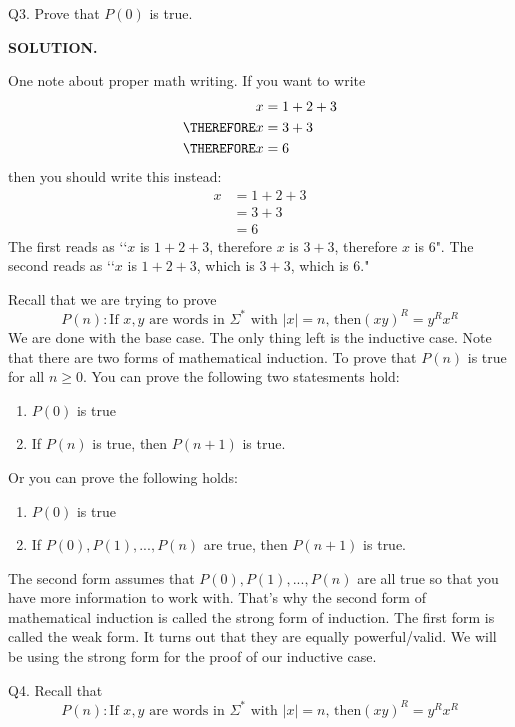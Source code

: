 \newpage
Q3. 
Prove that $P(0)$ is true.

\textbf{SOLUTION.}


One note about proper math writing.
If you want to write
\begin{align*}
x &= 1 + 2 + 3 \\
\THEREFORE x &= 3 + 3 \\
\THEREFORE x &= 6
\end{align*}
then you should write this instead:
\begin{align*}
x &= 1 + 2 + 3 \\
  &= 3 + 3 \\
  &= 6 
\end{align*}
The first reads as
\lq\lq $x$ is $1 + 2 + 3$, therefore
$x$ is $3 + 3$, therefore $x$ is 6".
The second reads as
\lq\lq $x$ is $1 + 2 + 3$, which is $3+3$, which is $6$."


\newpage
Recall that we are trying to prove
\[
P(n): 
\text{
If $x,y$ are words in $\Sigma^*$ with $|x| = n$, then
$(xy)^R = y^R x^R$
}
\]
We are done with the base case.
The only thing left is the inductive case.
Note that there are two forms of mathematical induction.
To prove that $P(n)$ is true for all $n \geq 0$.
You can prove the following two statesments hold:
\begin{enumerate}
\item $P(0)$ is true
\item If $P(n)$ is true, then $P(n+1)$ is true.
\end{enumerate}
Or you can prove the following holds:
\begin{enumerate}
\item $P(0)$ is true
\item If $P(0), P(1), ..., P(n)$ are true, then $P(n+1)$ is true.
\end{enumerate}
The second form assumes that $P(0), P(1), ..., P(n)$ are all true so that you have 
more information to work with.
That's why the second form of mathematical induction is called
the strong form of induction.
The first form is called the weak form.
It turns out that they are equally powerful/valid.
We will be using the strong form for the proof
of our inductive case.




\newpage
Q4. 
Recall that 
\[
P(n): 
\text{
If $x,y$ are words in $\Sigma^*$ with $|x| = n$, then
$(xy)^R = y^R x^R$
}
\]

